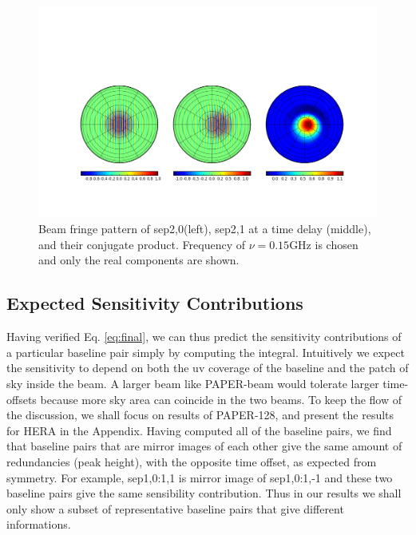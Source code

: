 \documentclass[preprint2,numberedappendix,tighten,twocolappendix]{aastex6}  %
\renewcommand\[{\begin{equation}}
\renewcommand\]{\end{equation}}
\begin{document}
\begin{figure}[H]
\includegraphics[width=\linewidth]{fringe_res}
\caption{Beam fringe pattern of sep2,0(left), sep2,1 at a time delay (middle),
and their conjugate product. Frequency of $\nu=0.15\text{GHz}$ is
chosen and only the real components are shown. \label{fig:Beam-fringe-pattern}}
\end{figure}


\subsection{Expected Sensitivity Contributions}

Having verified Eq. \eqref{eq:final}, we can thus predict the sensitivity contributions of a
particular baseline pair simply by computing the integral.
Intuitively we expect the sensitivity to depend on both the uv coverage of the baseline and the patch of sky inside the beam. A larger beam like PAPER-beam would tolerate larger time-offsets because more sky area can coincide in the two beams. To keep the flow of the discussion, we shall focus on results of PAPER-128, and present the results for HERA in the Appendix. 
Having computed all of the baseline pairs, we find that baseline pairs that are mirror images of each other 
give the same amount of redundancies (peak height), with the opposite time offset, as expected from symmetry. 
For example, sep1,0:1,1 is mirror image of sep1,0:1,-1 and these two baseline pairs
give the same sensibility contribution. Thus in our results we shall only show a subset of representative baseline pairs 
that give different informations. 
\end{document}
